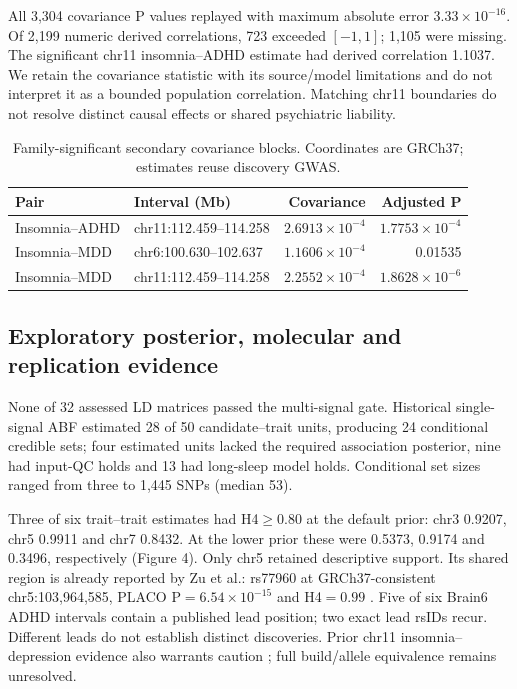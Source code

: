 \documentclass[11pt]{article}
\begin{document}
All 3,304 covariance P values replayed with maximum absolute error $3.33\times10^{-16}$. Of 2,199 numeric derived correlations, 723 exceeded $[-1,1]$; 1,105 were missing. The significant chr11 insomnia--ADHD estimate had derived correlation 1.1037. We retain the covariance statistic with its source/model limitations and do not interpret it as a bounded population correlation. Matching chr11 boundaries do not resolve distinct causal effects or shared psychiatric liability.

\begin{table}[htbp]\centering\small
\caption{Family-significant secondary covariance blocks. Coordinates are GRCh37; estimates reuse discovery GWAS.}\label{tab:local}
\begin{tabular}{@{}llrr@{}}\toprule
Pair & Interval (Mb) & Covariance & Adjusted P\\\midrule
Insomnia--ADHD & chr11:112.459--114.258 & $2.6913\times10^{-4}$ & $1.7753\times10^{-4}$\\
Insomnia--MDD & chr6:100.630--102.637 & $1.1606\times10^{-4}$ & 0.01535\\
Insomnia--MDD & chr11:112.459--114.258 & $2.2552\times10^{-4}$ & $1.8628\times10^{-6}$\\\bottomrule
\end{tabular}
\end{table}

\subsection*{Exploratory posterior, molecular and replication evidence}
None of 32 assessed LD matrices passed the multi-signal gate. Historical single-signal ABF estimated 28 of 50 candidate--trait units, producing 24 conditional credible sets; four estimated units lacked the required association posterior, nine had input-QC holds and 13 had long-sleep model holds. Conditional set sizes ranged from three to 1,445 SNPs (median 53).

Three of six trait--trait estimates had H4$\geq0.80$ at the default prior: chr3 0.9207, chr5 0.9911 and chr7 0.8432. At the lower prior these were 0.5373, 0.9174 and 0.3496, respectively (Figure 4). Only chr5 retained descriptive support. Its shared region is already reported by Zu et al.: rs77960 at GRCh37-consistent chr5:103,964,585, PLACO P$=6.54\times10^{-15}$ and H4$=0.99$ \cite{zu}. Five of six Brain6 ADHD intervals contain a published lead position; two exact lead rsIDs recur. Different leads do not establish distinct discoveries. Prior chr11 insomnia--depression evidence also warrants caution \cite{schipper}; full build/allele equivalence remains unresolved.
\end{document}
